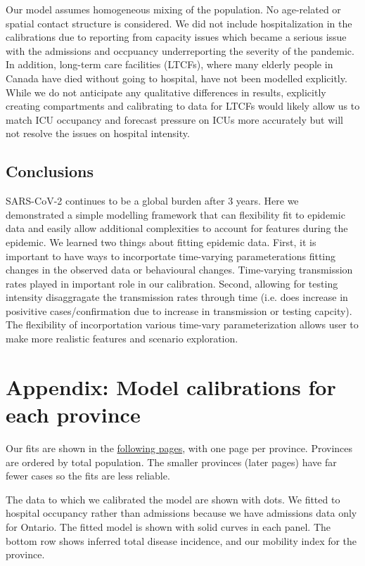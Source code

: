 \documentclass[12pt]{article}\usepackage[]{graphicx}\usepackage[]{color}
\begin{document}
Our model assumes homogeneous mixing of the population. 
No age-related or spatial contact structure is considered. 
We did not include hospitalization in the calibrations due to reporting from capacity issues which became a serious issue with the admissions and occpuancy underreporting the severity of the pandemic.
In addition, long-term care facilities (LTCFs), where many elderly people in Canada have died without going to hospital, have not been modelled explicitly.  
While we do not anticipate any qualitative differences in results, explicitly creating compartments and calibrating to data for LTCFs would likely allow us to match ICU occupancy and forecast
pressure on ICUs more accurately but will not resolve the issues on hospital intensity. 

\subsection{Conclusions}

SARS-CoV-2 continues to be a global burden after 3 years. 
Here we demonstrated a simple modelling framework that can flexibility fit to epidemic data and easily allow additional complexities to account for features during the epidemic. 
We learned two things about fitting epidemic data. 
First, it is important to have ways to incorportate time-varying parameterations fitting changes in the observed data or behavioural changes. Time-varying transmission rates played in important role in our calibration. 
Second, allowing for testing intensity disaggragate the transmission rates through time (i.e. does increase in posivitive cases/confirmation due to increase in transmission or testing capcity). 
The flexibility of incorportation various time-vary parameterization allows user to make more realistic features and scenario exploration. 


\clearpage

\section{Appendix: Model calibrations for each province}\label{sec:supp}

Our fits are shown in the \hyperlink{current.fits}{following pages},
with one page per province.  Provinces are ordered by total
population. The smaller provinces (later pages) have far fewer cases
so the fits are less reliable.

The data to which we calibrated the model are shown with dots.
We fitted to hospital occupancy rather than admissions because
we have admissions data only for Ontario.  The fitted model
is shown with solid curves in each panel.
The bottom row shows inferred total disease incidence,
and
our mobility index for the province.

\FloatBarrier
\clearpage


\clearpage



\end{document}
